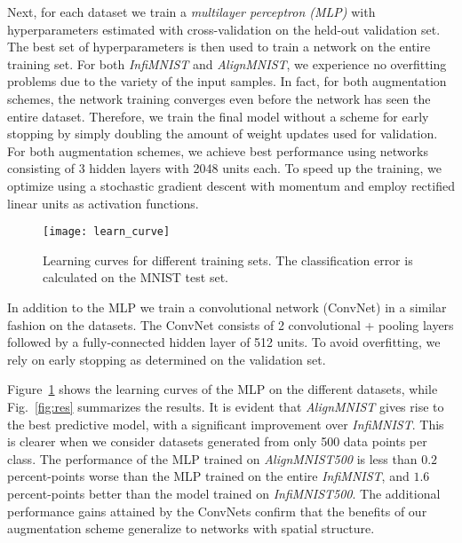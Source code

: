 \documentclass[twoside]{article}
\begin{document}
  Next, for each dataset we train a \emph{multilayer perceptron (MLP)} with hyperparameters
  estimated with cross-validation on 
  the held-out validation set.
  The best set of hyperparameters is then used to train a network on the entire training set.
  For both \emph{InfiMNIST} and \emph{AlignMNIST}, we experience no overfitting problems due
  to the variety of the input samples. In fact, for both augmentation schemes,
  the network training converges even before the network has seen the entire
  dataset. Therefore, we train the final model without a scheme for early
  stopping by simply doubling the amount of weight updates used for validation.
  For both augmentation schemes, we achieve best performance using networks
  consisting of 3 hidden layers with 2048 units each.
  To speed up the training, we optimize using a stochastic gradient descent with
  momentum and employ rectified linear units as activation functions.

\begin{figure}
    \centering
    \texttt{[image: learn\_curve]}
    \caption{Learning curves for different training sets. The 
      classification error is calculated on the MNIST test set.}
    \label{fig:learn_curve}
  \end{figure}

In addition to the MLP we train a convolutional network (ConvNet) in a similar fashion on the datasets.
The ConvNet consists of 2 convolutional + pooling layers followed by a fully-connected hidden layer of 512 units.
To avoid overfitting, we rely on early stopping as determined on the validation set.

  Figure~\ref{fig:learn_curve} shows the learning curves of the MLP on the different
  datasets, while Fig.~\ref{fig:res} summarizes the results.
  It is evident that \emph{AlignMNIST} gives rise to the best predictive model,
  with a significant improvement over \emph{InfiMNIST}. This is clearer
  when we consider datasets generated from only 500 data points per class.
  The performance of the MLP trained on \emph{AlignMNIST500} is less than $0.2$
  percent-points worse than the MLP trained on the entire \emph{InfiMNIST},
  and $1.6$ percent-points better than the model trained on \emph{InfiMNIST500}.
  The additional performance gains attained by the ConvNets confirm that the
  benefits of our augmentation scheme generalize to networks with spatial structure.
\end{document}
